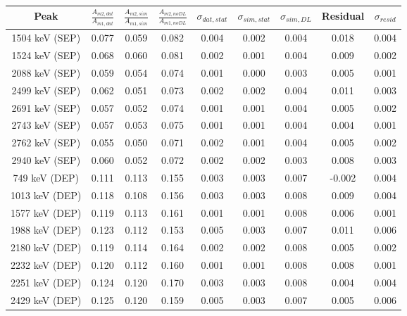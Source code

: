 \begin{tabular}{|c|c c c|c c c|c c|}
\hline
  Peak & $\frac{A_{m2,dat}}{A_{m1,dat}}$ & $\frac{A_{m2,sim}}{A_{m1,sim}}$ & $\frac{A_{m2,noDL}}{A_{m1,noDL}}$ & $\sigma_{dat,stat}$ & $\sigma_{sim,stat}$ & $\sigma_{sim,DL}$ & Residual & $\sigma_{resid}$ \\
\hline
  1504 keV (SEP) & 0.077 & 0.059 & 0.082 & 0.004 & 0.002 & 0.004 & 0.018 & 0.004 \\
  1524 keV (SEP) & 0.068 & 0.060 & 0.081 & 0.002 & 0.001 & 0.004 & 0.009 & 0.002 \\
  2088 keV (SEP) & 0.059 & 0.054 & 0.074 & 0.001 & 0.000 & 0.003 & 0.005 & 0.001 \\
  2499 keV (SEP) & 0.062 & 0.051 & 0.073 & 0.002 & 0.002 & 0.004 & 0.011 & 0.003 \\
  2691 keV (SEP) & 0.057 & 0.052 & 0.074 & 0.001 & 0.001 & 0.004 & 0.005 & 0.002 \\
  2743 keV (SEP) & 0.057 & 0.053 & 0.075 & 0.001 & 0.001 & 0.004 & 0.004 & 0.001 \\
  2762 keV (SEP) & 0.055 & 0.050 & 0.071 & 0.002 & 0.001 & 0.004 & 0.005 & 0.002 \\
  2940 keV (SEP) & 0.060 & 0.052 & 0.072 & 0.002 & 0.002 & 0.003 & 0.008 & 0.003 \\
  749 keV (DEP) & 0.111 & 0.113 & 0.155 & 0.003 & 0.003 & 0.007 & -0.002 & 0.004 \\
  1013 keV (DEP) & 0.118 & 0.108 & 0.156 & 0.003 & 0.003 & 0.008 & 0.009 & 0.004 \\
  1577 keV (DEP) & 0.119 & 0.113 & 0.161 & 0.001 & 0.001 & 0.008 & 0.006 & 0.001 \\
  1988 keV (DEP) & 0.123 & 0.112 & 0.153 & 0.005 & 0.003 & 0.007 & 0.011 & 0.006 \\
  2180 keV (DEP) & 0.119 & 0.114 & 0.164 & 0.002 & 0.002 & 0.008 & 0.005 & 0.002 \\
  2232 keV (DEP) & 0.120 & 0.112 & 0.160 & 0.001 & 0.001 & 0.008 & 0.008 & 0.001 \\
  2251 keV (DEP) & 0.124 & 0.120 & 0.170 & 0.003 & 0.003 & 0.008 & 0.004 & 0.004 \\
  2429 keV (DEP) & 0.125 & 0.120 & 0.159 & 0.005 & 0.003 & 0.007 & 0.005 & 0.006 \\
\hline
\end{tabular}
